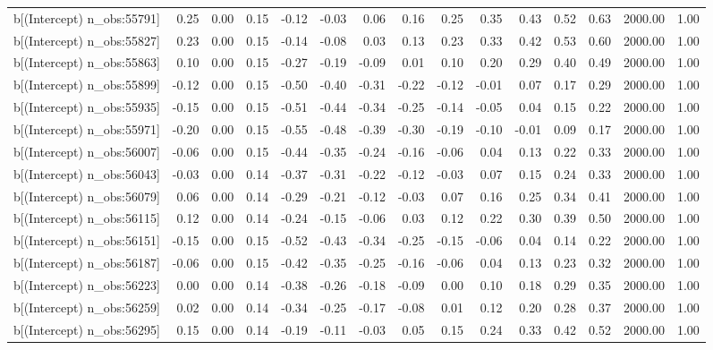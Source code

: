 \begin{table}[ht]
\begin{tabular}{rrrrrrrrrrrrrrr}
  b[(Intercept) n\_obs:55791] & 0.25 & 0.00 & 0.15 & -0.12 & -0.03 & 0.06 & 0.16 & 0.25 & 0.35 & 0.43 & 0.52 & 0.63 & 2000.00 & 1.00 \\ 
  b[(Intercept) n\_obs:55827] & 0.23 & 0.00 & 0.15 & -0.14 & -0.08 & 0.03 & 0.13 & 0.23 & 0.33 & 0.42 & 0.53 & 0.60 & 2000.00 & 1.00 \\ 
  b[(Intercept) n\_obs:55863] & 0.10 & 0.00 & 0.15 & -0.27 & -0.19 & -0.09 & 0.01 & 0.10 & 0.20 & 0.29 & 0.40 & 0.49 & 2000.00 & 1.00 \\ 
  b[(Intercept) n\_obs:55899] & -0.12 & 0.00 & 0.15 & -0.50 & -0.40 & -0.31 & -0.22 & -0.12 & -0.01 & 0.07 & 0.17 & 0.29 & 2000.00 & 1.00 \\ 
  b[(Intercept) n\_obs:55935] & -0.15 & 0.00 & 0.15 & -0.51 & -0.44 & -0.34 & -0.25 & -0.14 & -0.05 & 0.04 & 0.15 & 0.22 & 2000.00 & 1.00 \\ 
  b[(Intercept) n\_obs:55971] & -0.20 & 0.00 & 0.15 & -0.55 & -0.48 & -0.39 & -0.30 & -0.19 & -0.10 & -0.01 & 0.09 & 0.17 & 2000.00 & 1.00 \\ 
  b[(Intercept) n\_obs:56007] & -0.06 & 0.00 & 0.15 & -0.44 & -0.35 & -0.24 & -0.16 & -0.06 & 0.04 & 0.13 & 0.22 & 0.33 & 2000.00 & 1.00 \\ 
  b[(Intercept) n\_obs:56043] & -0.03 & 0.00 & 0.14 & -0.37 & -0.31 & -0.22 & -0.12 & -0.03 & 0.07 & 0.15 & 0.24 & 0.33 & 2000.00 & 1.00 \\ 
  b[(Intercept) n\_obs:56079] & 0.06 & 0.00 & 0.14 & -0.29 & -0.21 & -0.12 & -0.03 & 0.07 & 0.16 & 0.25 & 0.34 & 0.41 & 2000.00 & 1.00 \\ 
  b[(Intercept) n\_obs:56115] & 0.12 & 0.00 & 0.14 & -0.24 & -0.15 & -0.06 & 0.03 & 0.12 & 0.22 & 0.30 & 0.39 & 0.50 & 2000.00 & 1.00 \\ 
  b[(Intercept) n\_obs:56151] & -0.15 & 0.00 & 0.15 & -0.52 & -0.43 & -0.34 & -0.25 & -0.15 & -0.06 & 0.04 & 0.14 & 0.22 & 2000.00 & 1.00 \\ 
  b[(Intercept) n\_obs:56187] & -0.06 & 0.00 & 0.15 & -0.42 & -0.35 & -0.25 & -0.16 & -0.06 & 0.04 & 0.13 & 0.23 & 0.32 & 2000.00 & 1.00 \\ 
  b[(Intercept) n\_obs:56223] & 0.00 & 0.00 & 0.14 & -0.38 & -0.26 & -0.18 & -0.09 & 0.00 & 0.10 & 0.18 & 0.29 & 0.35 & 2000.00 & 1.00 \\ 
  b[(Intercept) n\_obs:56259] & 0.02 & 0.00 & 0.14 & -0.34 & -0.25 & -0.17 & -0.08 & 0.01 & 0.12 & 0.20 & 0.28 & 0.37 & 2000.00 & 1.00 \\ 
  b[(Intercept) n\_obs:56295] & 0.15 & 0.00 & 0.14 & -0.19 & -0.11 & -0.03 & 0.05 & 0.15 & 0.24 & 0.33 & 0.42 & 0.52 & 2000.00 & 1.00 \\ 

\end{tabular}
\end{table}
